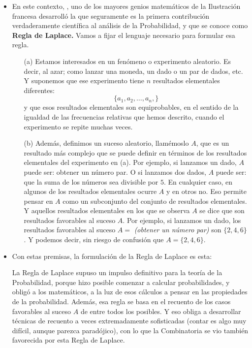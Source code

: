 \begin{itemize}
        \item En este contexto, , uno de los mayores genios matemáticos de la Ilustración francesa desarrolló la que seguramente es la primera contribución verdaderamente científica al análisis de la Probabilidad, y que se conoce como {\bf Regla de Laplace.} Vamos a fijar el lenguaje necesario para formular esa regla.
            \begin{itemize}
                \item[(a)]  Estamos interesados en un {\sf fenómeno o experimento aleatorio}. Es decir, al azar; como lanzar una moneda, un dado o un par de dados, etc. Y suponemos que ese experimento tiene $n$ {\sf resultados elementales} diferentes:
                    \[\{a_1,a_2,\ldots,a_n,\}\]
                    y que esos resultados elementales son {\sf equiprobables}, en el sentido de la igualdad de las frecuencias relativas que hemos descrito, cuando el experimento se repite muchas veces.
                \item[(b)]  Además, definimos un {\sf suceso aleatorio}, llamémoslo $A$, que es un resultado más complejo que se puede definir en términos de los resultados elementales del experimento en (a). Por ejemplo, si lanzamos un dado, $A$ puede ser: obtener un número par. O si lanzamos dos dados, $A$ puede ser: que la suma de los números sea divisible por $5$. En cualquier caso, en algunos de los resultados elementales ocurre $A$ y en otros no. Eso permite pensar en $A$ como un {\sf subconjunto del conjunto de resultados elementales}. Y aquellos resultados elementales en los que se observa $A$ se dice que son {\sf resultados favorables} al suceso $A$. Por ejemplo, si lanzamos un dado, los resultados favorables al suceso $A=$ {\em(obtener un número par)} son $\{2,4,6\}$. Y podemos decir, sin riesgo de confusión que $A=\{2,4,6\}$.
        \end{itemize}

    \item Con estas premisas, la formulación de la Regla de Laplace es esta:
        \begin{center}
        \end{center}
        La Regla de Laplace supuso un impulso definitivo para la teoría de la Probabilidad, porque hizo posible comenzar a calcular probabilidades, y obligó a los matemáticos, a la luz de esos cálculos a pensar en las propiedades de la probabilidad. Además, esa regla se basa en el recuento de los casos favorables al suceso $A$ de entre todos los posibles. Y eso obliga a desarrollar técnicas de recuento a veces extremadamente sofisticadas (contar es algo muy difícil, aunque parezca paradójico), con lo que la Combinatoria se vio también favorecida por esta Regla de Laplace.


\end{itemize}
